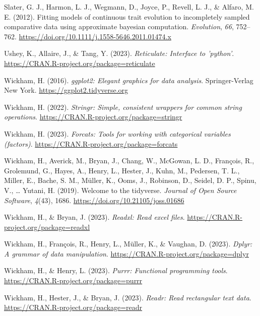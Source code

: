 \documentclass[
  jou]{apa6}
\newlength{\cslhangindent}
\newlength{\cslentryspacingunit} %
\newenvironment{CSLReferences}[2] %
 {%
  \setlength{\parindent}{0pt}
  \ifodd #1
  \let\oldpar\par
  \def\par{\hangindent=\cslhangindent\oldpar}
  \fi
  \setlength{\parskip}{#2\cslentryspacingunit}
 }%
 {}
\begin{document}
\begin{CSLReferences}{1}{0}
\leavevmode{}%
Slater, G. J., Harmon, L. J., Wegmann, D., Joyce, P., Revell, L. J., \& Alfaro, M. E. (2012). Fitting models of continuous trait evolution to incompletely sampled comparative data using approximate bayesian computation. \emph{Evolution}, \emph{66}, 752--762. \url{https://doi.org/10.1111/j.1558-5646.2011.01474.x}

\leavevmode{}%
Ushey, K., Allaire, J., \& Tang, Y. (2023). \emph{Reticulate: Interface to 'python'}. \url{https://CRAN.R-project.org/package=reticulate}

\leavevmode{}%
Wickham, H. (2016). \emph{ggplot2: Elegant graphics for data analysis}. Springer-Verlag New York. \url{https://ggplot2.tidyverse.org}

\leavevmode{}%
Wickham, H. (2022). \emph{Stringr: Simple, consistent wrappers for common string operations}. \url{https://CRAN.R-project.org/package=stringr}

\leavevmode{}%
Wickham, H. (2023). \emph{Forcats: Tools for working with categorical variables (factors)}. \url{https://CRAN.R-project.org/package=forcats}

\leavevmode{}%
Wickham, H., Averick, M., Bryan, J., Chang, W., McGowan, L. D., François, R., Grolemund, G., Hayes, A., Henry, L., Hester, J., Kuhn, M., Pedersen, T. L., Miller, E., Bache, S. M., Müller, K., Ooms, J., Robinson, D., Seidel, D. P., Spinu, V., \ldots{} Yutani, H. (2019). Welcome to the {tidyverse}. \emph{Journal of Open Source Software}, \emph{4}(43), 1686. \url{https://doi.org/10.21105/joss.01686}

\leavevmode{}%
Wickham, H., \& Bryan, J. (2023). \emph{Readxl: Read excel files}. \url{https://CRAN.R-project.org/package=readxl}

\leavevmode{}%
Wickham, H., François, R., Henry, L., Müller, K., \& Vaughan, D. (2023). \emph{Dplyr: A grammar of data manipulation}. \url{https://CRAN.R-project.org/package=dplyr}

\leavevmode{}%
Wickham, H., \& Henry, L. (2023). \emph{Purrr: Functional programming tools}. \url{https://CRAN.R-project.org/package=purrr}

\leavevmode{}%
Wickham, H., Hester, J., \& Bryan, J. (2023). \emph{Readr: Read rectangular text data}. \url{https://CRAN.R-project.org/package=readr}


\end{CSLReferences}
\end{document}
